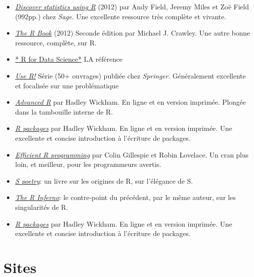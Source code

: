 \documentclass[
  letterpaper,
  DIV=11,
  numbers=noendperiod]{scrreprt}
\providecommand{\tightlist}{%
  \setlength{\itemsep}{0pt}\setlength{\parskip}{0pt}}\usepackage{longtable,booktabs,array}
\begin{document}
\begin{itemize}
\tightlist
\item
  \href{http://www.sagepub.com/dsur/main.htm}{\emph{Discover statistics
  using R}} (2012) par Andy Field, Jeremy Miles et Zoë Field (992pp.)
  chez \emph{Sage}. Une excellente ressource très complète et vivante.
\item
  \href{http://eu.wiley.com/WileyCDA/WileyTitle/productCd-0470973927.html}{\emph{The
  R Book}} (2012) Seconde édition par Michael J. Crawley. Une autre
  bonne ressource, complète, sur R.
\item
  \href{https://r4ds.had.co.nz/}{* R for Data Science*} LA référence
\item
  \href{http://www.springer.com/series/6991}{\emph{Use R!}} Série (50+
  ouvrages) publiée chez \emph{Springer}. Généralement excellente et
  focalisée sur une problématique
\item
  \href{http://adv-r.had.co.nz/}{\emph{Advanced R}} par Hadley Wickham.
  En ligne et en version imprimée. Plongée dans la tambouille interne de
  R.
\item
  \href{http://r-pkgs.had.co.nz/}{\emph{R packages}} par Hadley Wickham.
  En ligne et en version imprimée. Une excellente et concise
  introduction à l'écriture de packages.
\item
  \href{https://csgillespie.github.io/efficientR/}{\emph{Efficient R
  programming}} par Colin Gillespie et Robin Lovelace. Un cran plus
  loin, et meilleur, pour les programmeurs avertis.
\item
  \href{http://www.burns-stat.com/documents/books/s-poetry/}{\emph{S
  poetry}}: un livre sur les origines de R, sur l'élégance de S.
\item
  \href{http://www.burns-stat.com/documents/books/the-r-inferno/}{\emph{The
  R Inferno}}: le contre-point du précédent, par le même auteur, sur les
  singularités de R.
\item
  \href{http://r-pkgs.had.co.nz/}{\emph{R packages}} par Hadley Wickham.
  En ligne et en version imprimée. Une excellente et concise
  introduction à l'écriture de packages.
\end{itemize}

\hypertarget{sites}{%
\section{Sites}\label{sites}}
\end{document}
